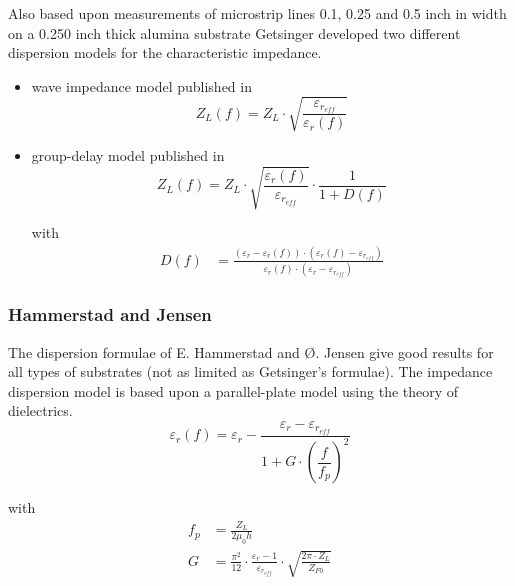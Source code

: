 Also based upon measurements of microstrip lines 0.1, 0.25 and 0.5
inch in width on a 0.250 inch thick alumina substrate Getsinger
\cite{Getsinger2} developed two different dispersion models for the
characteristic impedance.

\begin{itemize}
\item wave impedance model published in \cite{Getsinger2}
\begin{equation}
Z_{L}(f) = Z_{L}\cdot\sqrt{\frac{\varepsilon_{r_{eff}}}{\varepsilon_{r}(f)}}
\end{equation}

\item group-delay model published in \cite{Getsinger3}
\begin{equation}
Z_{L}(f) = Z_{L}\cdot\sqrt{\frac{\varepsilon_{r}(f)}{\varepsilon_{r_{eff}}}}\cdot\frac{1}{1 + D(f)}
\end{equation}

with
\begin{align}
D(f) &= \frac{\left(\varepsilon_{r} - \varepsilon_{r}(f)\right)\cdot\left(\varepsilon_{r}(f) - \varepsilon_{r_{eff}}\right)}{\varepsilon_{r}(f)\cdot\left(\varepsilon_{r} - \varepsilon_{r_{eff}}\right)}
\end{align}
\end{itemize}

\subsubsection{Hammerstad and Jensen}

The dispersion formulae of E. Hammerstad and {\O}. Jensen
\cite{Hammerstad} give good results for all types of substrates (not
as limited as Getsinger's formulae).  The impedance dispersion model
is based upon a parallel-plate model using the theory of dielectrics.
\begin{equation}
\varepsilon_{r}(f) = \varepsilon_{r} - \frac{\varepsilon_{r} - \varepsilon_{r_{eff}}}{1 + G\cdot \left(\dfrac{f}{f_{p}}\right)^{2}}
\end{equation}

with
\begin{align}
f_{p} &= \frac{Z_{L}}{2\mu_{0} h}\\
G &= \frac{\pi^{2}}{12}\cdot\frac{\varepsilon_{r} - 1}{\varepsilon_{r_{eff}}}\cdot\sqrt{\frac{2\pi\cdot Z_{L}}{Z_{F0}}}
\end{align}

